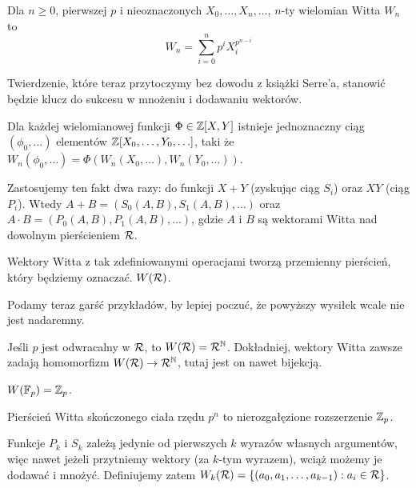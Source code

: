 \begin{definicja}
	Dla $n \ge 0$, pierwszej $p$ i nieoznaczonych $X_0, \ldots, X_n, \ldots$, $n$-ty wielomian Witta $W_n$ to
	\[
		W_n = \sum_{i = 0}^n p^i X_i^{p^{n-i}}
	\]
\end{definicja}

Twierdzenie, które teraz przytoczymy bez dowodu z książki Serre'a, stanowić będzie klucz do sukcesu w mnożeniu i dodawaniu wektorów.

\begin{fakt}
	Dla każdej wielomianowej funkcji $\Phi \in \mathbb Z[X, Y]$ istnieje jednoznaczny ciąg $(\phi_0, \ldots)$ elementów $\mathbb Z[X_0, \ldots, Y_0, \ldots]$, taki że $W_n(\phi_0, \ldots) = \Phi(W_n(X_0, \ldots), W_n(Y_0, \ldots))$.
\end{fakt}

Zastosujemy ten fakt dwa razy: do funkcji $X+Y$ (zyskując ciąg $S_i$) oraz $XY$ (ciąg $P_i$).
Wtedy $A + B = (S_0(A,B), S_1(A,B), \ldots)$ oraz $A \cdot B = (P_0(A,B), P_1(A,B), \ldots)$, gdzie $A$ i $B$ są wektorami Witta nad dowolnym pierścieniem $\mathcal R$.

\begin{wniosek}
	Wektory Witta z tak zdefiniowanymi operacjami tworzą przemienny pierścień, który będziemy oznaczać. $W(\mathcal R)$.
\end{wniosek}

Podamy teraz garść przykładów, by lepiej poczuć, że powyższy wysiłek wcale nie jest nadaremny.

\begin{przyklad}
	Jeśli $p$ jest odwracalny w $\mathcal R$, to $W(\mathcal R) = \mathcal R^\mathbb N$.
	Dokładniej, wektory Witta zawsze zadają homomorfizm $W(\mathcal R) \to \mathcal R^\mathbb N$, tutaj jest on nawet bijekcją.
\end{przyklad}

\begin{przyklad}
	$W(\mathbb F_p) = \mathbb Z_p$.
\end{przyklad}

\begin{przyklad}
	Pierścień Witta skończonego ciała rzędu $p^n$ to nierozgałęzione rozszerzenie $\mathbb Z_p$.
\end{przyklad}

Funkcje $P_k$ i $S_k$ zależą jedynie od pierwszych $k$ wyrazów własnych argumentów, więc nawet jeżeli przytniemy wektory (za $k$-tym wyrazem), wciąż możemy je dodawać i mnożyć.
Definiujemy zatem $W_k(\mathcal R) = \{(a_0, a_1, \ldots, a_{k-1}) : a_i \in \mathcal R\}$.

